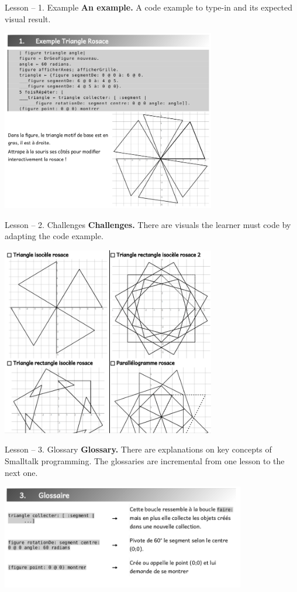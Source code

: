 \documentclass{beamer}
\begin{document}
\begin{frame}{Lesson -- 1. Example}
  \textbf{An example.} A code example to type-in and its expected
  visual result.
  \begin{center}
    \includegraphics[width=0.7\textwidth]{lessonTypein.png}
  \end{center}
\end{frame}
%
\begin{frame}{Lesson -- 2. Challenges}
  \textbf{Challenges.} There are visuals the learner must code by
  adapting the code example.
  \begin{center}
    \includegraphics[width=0.7\textwidth]{lessonChallenges.png}
  \end{center}
\end{frame}
%
\begin{frame}{Lesson -- 3. Glossary}
  \textbf{Glossary.} There are explanations on key concepts of
  Smalltalk programming. The glossaries are incremental from one
  lesson to the next one.
  \begin{center}
    \includegraphics[width=0.8\textwidth]{lessonGlossary.png}
  \end{center}
\end{frame}
%
\end{document}
